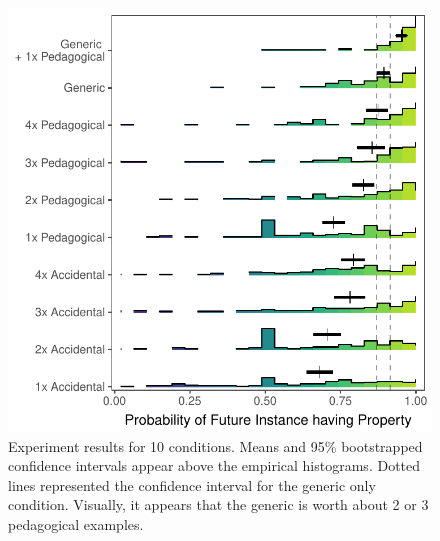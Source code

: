 \documentclass[10pt,letterpaper]{article}
\begin{document}

\begin{figure}[t]
\begin{center}
\includegraphics[width=\linewidth]{figs/genex-pilots_10conditions_reordered.pdf}
\end{center}
\caption{Experiment results for 10 conditions. Means and 95\% bootstrapped confidence intervals appear above the empirical histograms. Dotted lines represented the confidence interval for the generic only condition. Visually, it appears that the generic is worth about 2 or 3 pedagogical examples.}
\label{fig:results}
\end{figure}
\end{document}
